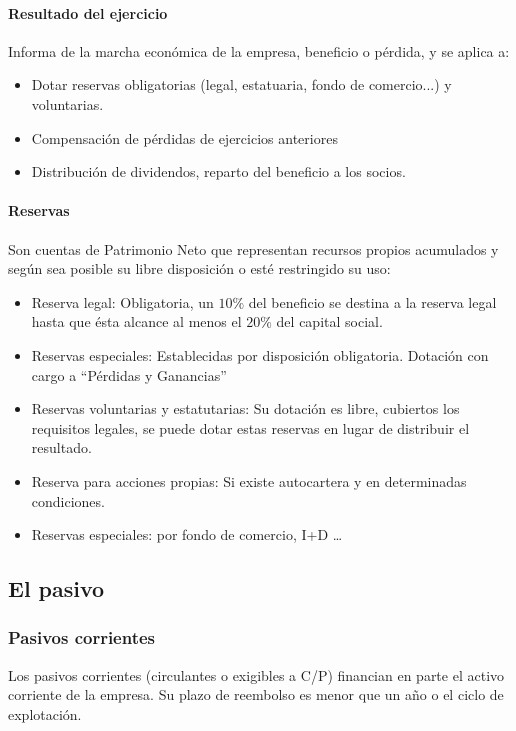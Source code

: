 \paragraph{Resultado del ejercicio}
Informa de la marcha económica de la empresa, beneficio o pérdida, y se aplica a:
\begin{itemize}
    \item Dotar reservas obligatorias (legal, estatuaria, fondo de comercio...) y voluntarias.
    \item Compensación de pérdidas de ejercicios anteriores
    \item Distribución de dividendos, reparto del beneficio a los socios.
\end{itemize}

\paragraph{Reservas}
Son cuentas de Patrimonio Neto que representan recursos propios acumulados y según sea posible su libre disposición o esté restringido su uso:
\begin{itemize}
    \item Reserva legal: Obligatoria, un $10 \%$ del beneficio se destina a la reserva legal hasta que ésta alcance al menos el $20 \%$ del capital social.
    \item Reservas especiales: Establecidas por disposición obligatoria. Dotación con cargo a ``Pérdidas y Ganancias''
    \item Reservas voluntarias y estatutarias: Su dotación es libre, cubiertos los requisitos legales, se puede dotar estas reservas en lugar de distribuir el resultado.
    \item Reserva para acciones propias: Si existe autocartera y en determinadas condiciones.
    \item Reservas especiales: por fondo de comercio, I+D \dots
\end{itemize}


\subsection{El pasivo}
\subsubsection{Pasivos corrientes}
Los pasivos corrientes (circulantes o exigibles a C/P) financian en parte el activo corriente de la empresa.
Su plazo de reembolso es menor que un año o el ciclo de explotación.
